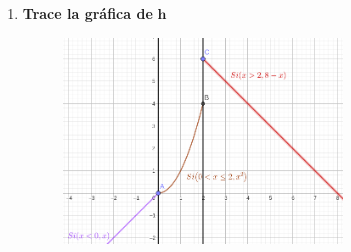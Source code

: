 \documentclass[12pt]{article}
\begin{document}
\begin{enumerate}[label=\textbf{\arabic*.}]
\begin{enumerate}[label=\textbf{(\alph*)}]
                    \newpage
                    \item \textbf{Trace la gráfica de} $\bm{h}$
                        \begin{figure}[h!]
                            \centering
                            \includegraphics[width=0.7\textwidth]{img/t1-ej9.png}
                        \end{figure}
                \end{enumerate}
            

\end{enumerate}
\end{document}
